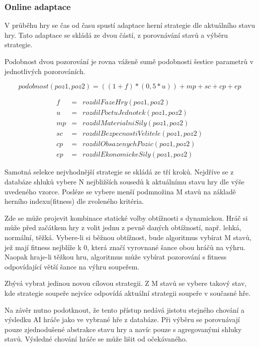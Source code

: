 \subsubsection{Online adaptace}

V průběhu hry se čas od času spustí adaptace herní strategie dle aktuálního stavu hry. Tato adaptace se skládá ze dvou částí, z porovnávání stavů a výběru strategie.

Podobnost dvou pozorování je rovna váženě sumě podobnosti šestice parametrů v jednotlivých pozorováních.

\begin{equation}
	   podobnost(poz1,poz2)=((1+f)*(0,5*u)) + mp + sc + cp + ep
\end{equation}

\begin{eqnarray*}
f &= &rozdilFazeHry(poz1,poz2) \\
u &= &rozdilPoctuJednotek(poz1,poz2) \\
mp &= &rozdilMaterialniSily(poz1,poz2) \\
sc &= &rozdilBezpecnostiVelitele(poz1,poz2) \\
cp &= &rozdilObsazenychPozic(poz1,poz2) \\
ep &= &rozdilEkonomickeSily(poz1,poz2)
\end{eqnarray*}

Samotná selekce nejvhodnější strategie se skládá ze tří kroků. Nejdříve se z databáze shluků vybere N nejbližších sousedů k aktuálnímu stavu hry dle výše uvedeného vzorce. Posléze se vybere menší podmnožina M stavů na základě herního indexu(fitness) dle zvoleného kritéria.

Zde se může projevit kombinace statické volby obtížnosti s dynamickou. Hráč si může před začátkem hry z volit jednu z pevně daných obtížností, např. lehká, normální, těžká. Vybere-li si běžnou obtížnost, bude algoritmus vybírat M stavů, jež mají fitness nejblíže k 0, která značí vyrovnané šance obou hráčů na výhru. Naopak hraje-li těžkou hru, algoritmus může vybírat pozorování s fitness odpovídající větší šance na výhru soupeřem.

Zbývá vybrat jedinou novou cílovou strategii. Z M stavů se vybere takový stav, kde strategie soupeře nejvíce odpovídá aktuální strategii soupeře v současné hře.

Na závěr nutno podotknout, že tento přístup nedává jistotu stejného chování a výsledku AI hráče jako ve vybrané hře z databáze. Při výběru se porovnávají pouze zjednodušené abstrakce stavu hry a navíc pouze s agregovanými shluky stavů. Výsledné chování hráče se může lišit od očekávaného.


